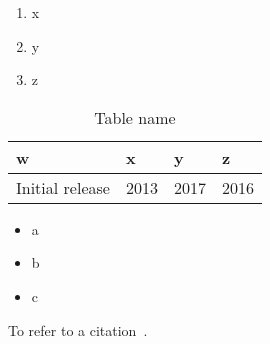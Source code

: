 \begin{enumerate}
    \item x
    \item y
    \item z
\end{enumerate}
\begin{table}[]
    \centering
\begin{tabular}{ | m{3cm} | m{3cm} | m{3cm} | m{3cm} | }
 \hline
 w & x & y & z \\
 \hline
 Initial release & 2013 & 2017 & 2016\\
\hline
\end{tabular}
    \caption{Table name}
    \label{tab:table1}
\end{table}
\newpage
\begin{itemize}
    \item a
    \item b
    \item c
\end{itemize}

To refer to a citation~\cite{test_2}.